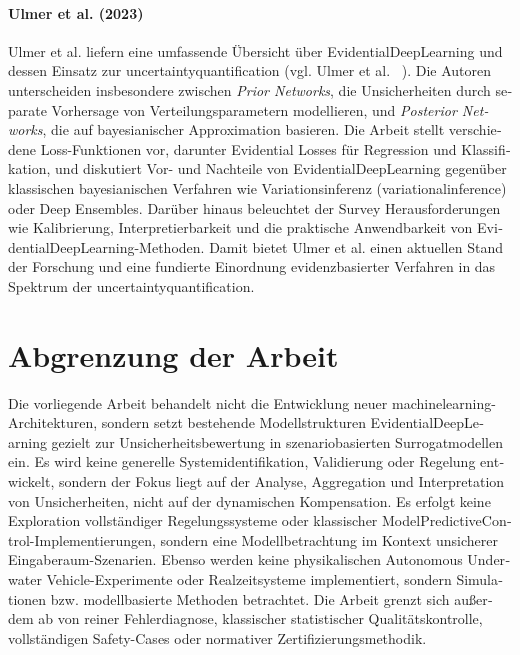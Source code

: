 

\begin{otherlanguage}{ngerman}

\paragraph{Ulmer et al. (2023)} Ulmer et al. liefern eine umfassende Übersicht über \gls{EvidentialDeepLearning} und dessen Einsatz zur \gls{uncertaintyquantification} (vgl. Ulmer et al. ~\parencite{Ulmer2023}). Die Autoren unterscheiden insbesondere zwischen \emph{Prior Networks}, die Unsicherheiten durch separate Vorhersage von Verteilungsparametern modellieren, und \emph{Posterior Networks}, die auf bayesianischer Approximation basieren. Die Arbeit stellt verschiedene Loss-Funktionen vor, darunter Evidential Losses für Regression und Klassifikation, und diskutiert Vor- und Nachteile von \gls{EvidentialDeepLearning} gegenüber klassischen bayesianischen Verfahren wie Variationsinferenz (\gls{variationalinference}) oder Deep Ensembles. Darüber hinaus beleuchtet der Survey Herausforderungen wie Kalibrierung, Interpretierbarkeit und die praktische Anwendbarkeit von \gls{EvidentialDeepLearning}-Methoden. Damit bietet Ulmer et al. einen aktuellen Stand der Forschung und eine fundierte Einordnung evidenzbasierter Verfahren in das Spektrum der \gls{uncertaintyquantification}. 

\section{Abgrenzung der Arbeit}

Die vorliegende Arbeit behandelt nicht die Entwicklung neuer \gls{machinelearning}-Architekturen, sondern setzt bestehende Modellstrukturen \gls{EvidentialDeepLearning} gezielt zur Unsicherheitsbewertung in szenariobasierten Surrogatmodellen ein. Es wird keine generelle Systemidentifikation, Validierung oder Regelung entwickelt, sondern der Fokus liegt auf der Analyse, Aggregation und Interpretation von Unsicherheiten, nicht auf der dynamischen Kompensation.
Es erfolgt keine Exploration vollständiger Regelungssysteme oder klassischer \gls{ModelPredictiveControl}-Implementierungen, sondern eine Modellbetrachtung im Kontext unsicherer Eingaberaum-Szenarien. Ebenso werden keine physikalischen \gls{Autonomous Underwater Vehicle}-Experimente oder Realzeitsysteme implementiert, sondern Simulationen bzw. modellbasierte Methoden betrachtet. Die Arbeit grenzt sich außerdem ab von reiner Fehlerdiagnose, klassischer statistischer Qualitätskontrolle, vollständigen Safety-Cases oder normativer Zertifizierungsmethodik. %



\end{otherlanguage}
